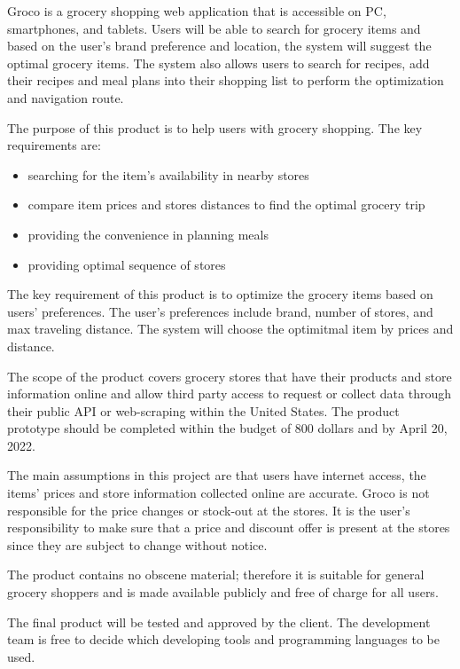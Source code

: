 Groco is a grocery shopping web application that is accessible on PC, smartphones, and tablets. Users will be able to search for grocery items and based on the user's brand preference and location, the system will suggest the optimal grocery items. The system also allows users to search for recipes, add their recipes and meal plans into their shopping list to perform the optimization and navigation route.

The purpose of this product is to help users with grocery shopping. The key requirements are:
\begin{itemize}
    \item searching for the item's availability in nearby stores
    \item compare item prices and stores distances to find the optimal grocery trip
    \item providing the convenience in planning meals
    \item providing optimal sequence of stores 
\end{itemize} 

The key requirement of this product is to optimize the grocery items based on users' preferences. The user's preferences include brand, number of stores, and max traveling distance. The system will choose the optimitmal item by prices and distance.  

The scope of the product covers grocery stores that have their products and store information online and allow third party access to request or collect data through their public API or web-scraping within the United States. The product prototype should be completed within the budget of 800 dollars and by April 20, 2022.

The main assumptions in this project are that users have internet access, the items' prices and store information collected online are accurate. Groco is not responsible for the price changes or stock-out at the stores. It is the user's responsibility to make sure that a price and discount offer is present at the stores since they are subject to change without notice.

The product contains no obscene material; therefore it is suitable for general grocery shoppers and is made available publicly and free of charge for all users.

The final product will be tested and approved by the client. The development team is free to decide which developing tools and programming languages to be used.

